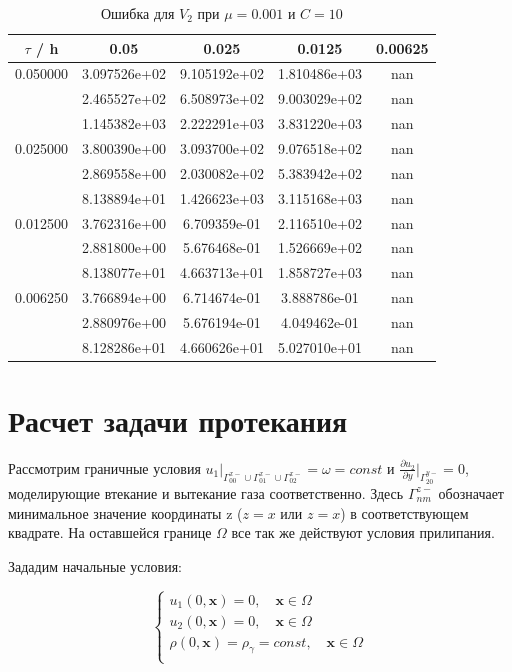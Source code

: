 \documentclass[specialist,subf,href,colorlinks=true,12pt
,times,mtpro,specialist
]{disser}
\begin{document}
\begin{table}[H]
\small
\caption{Ошибка для $V_2$ при $\mu=0.001$ и $C = 10$}
\begin{center}
\begin{tabular}{|c|c|c|c|c|}
\hline
$\tau$ / h & 0.05 & 0.025 & 0.0125 & 0.00625 \\
\hline
0.050000 & 3.097526e+02  & 9.105192e+02  & 1.810486e+03  & nan \\
 & 2.465527e+02  & 6.508973e+02  & 9.003029e+02  & nan \\
 & 1.145382e+03  & 2.222291e+03  & 3.831220e+03  & nan \\
\hline
0.025000 & 3.800390e+00  & 3.093700e+02  & 9.076518e+02  & nan \\
 & 2.869558e+00  & 2.030082e+02  & 5.383942e+02  & nan \\
 & 8.138894e+01  & 1.426623e+03  & 3.115168e+03  & nan \\
\hline
0.012500 & 3.762316e+00  & 6.709359e-01  & 2.116510e+02  & nan \\
 & 2.881800e+00  & 5.676468e-01  & 1.526669e+02  & nan \\
 & 8.138077e+01  & 4.663713e+01  & 1.858727e+03  & nan \\
\hline
0.006250 & 3.766894e+00  & 6.714674e-01  & 3.888786e-01  & nan \\
 & 2.880976e+00  & 5.676194e-01  & 4.049462e-01  & nan \\
 & 8.128286e+01  & 4.660626e+01  & 5.027010e+01  & nan \\
\hline
\end{tabular}
\end{center}
\end{table}

\section {Расчет задачи протекания}

Рассмотрим граничные условия ${u_1}|_{\Gamma_{00}^{x-} \cup \Gamma_{01}^{x-} \cup \Gamma_{02}^{x-}} = \omega = const$ и $\frac{\partial u_2}{\partial y}|_{\Gamma_{20}^{y-}} = 0$, моделирующие втекание и вытекание газа соответственно. Здесь $\Gamma_{nm}^{z-}$ обозначает минимальное значение координаты z ($z = x$ или $z = x$) в соответствующем квадрате. На оставшейся границе $\Omega$ все так же действуют условия прилипания.

Зададим начальные условия:

\begin{equation}
\begin{cases}
u_1(0, \boldsymbol{x}) = 0,\quad \boldsymbol{x} \in \Omega \\
u_2(0, \boldsymbol{x}) = 0,\quad \boldsymbol{x} \in \Omega \\
\rho(0, \boldsymbol{x}) = \rho_\gamma = const,\quad \boldsymbol{x} \in \Omega \\
\end{cases}
\end{equation}
\end{document}
